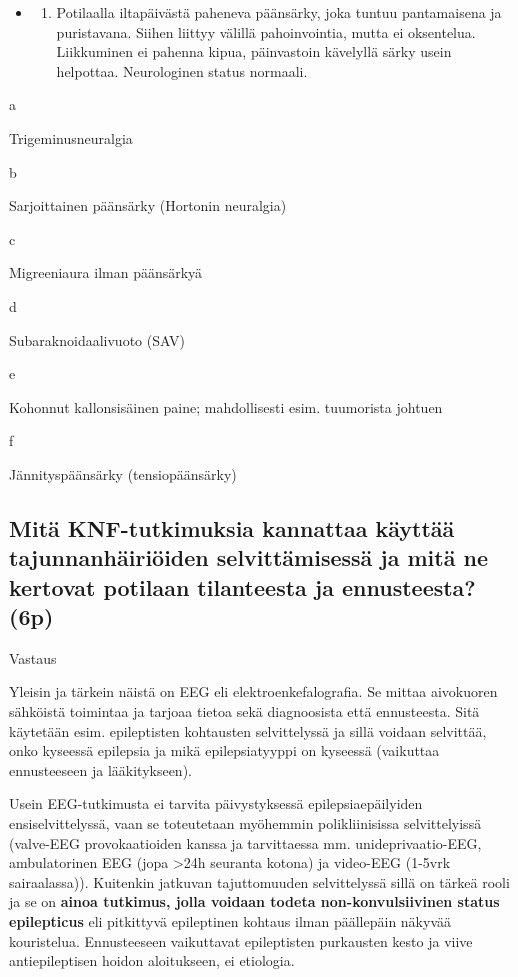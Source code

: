 \documentclass[
]{book}
\providecommand{\tightlist}{%
  \setlength{\itemsep}{0pt}\setlength{\parskip}{0pt}}
\begin{document}
\begin{itemize}
\begin{enumerate}
  \end{enumerate}
\item
  \begin{enumerate}
  \def\labelenumi{\alph{enumi}.}
  \setcounter{enumi}{5}
  \tightlist
  \item
    Potilaalla iltapäivästä paheneva päänsärky, joka tuntuu pantamaisena ja puristavana. Siihen liittyy välillä pahoinvointia, mutta ei oksentelua. Liikkuminen ei pahenna kipua, päinvastoin kävelyllä särky usein helpottaa. Neurologinen status normaali.
  \end{enumerate}
\end{itemize}

a

Trigeminusneuralgia

b

Sarjoittainen päänsärky (Hortonin neuralgia)

c

Migreeniaura ilman päänsärkyä

d

Subaraknoidaalivuoto (SAV)

e

Kohonnut kallonsisäinen paine; mahdollisesti esim. tuumorista johtuen

f

Jännityspäänsärky (tensiopäänsärky)

\subsection{Mitä KNF-tutkimuksia kannattaa käyttää tajunnanhäiriöiden selvittämisessä ja mitä ne kertovat potilaan tilanteesta ja ennusteesta? (6p)}\label{mituxe4-knf-tutkimuksia-kannattaa-kuxe4yttuxe4uxe4-tajunnanhuxe4iriuxf6iden-selvittuxe4misessuxe4-ja-mituxe4-ne-kertovat-potilaan-tilanteesta-ja-ennusteesta-6p}

Vastaus

Yleisin ja tärkein näistä on EEG eli elektroenkefalografia. Se mittaa aivokuoren sähköistä toimintaa ja tarjoaa tietoa sekä diagnoosista että ennusteesta. Sitä käytetään esim. epileptisten kohtausten selvittelyssä ja sillä voidaan selvittää, onko kyseessä epilepsia ja mikä epilepsiatyyppi on kyseessä (vaikuttaa ennusteeseen ja lääkitykseen).

Usein EEG-tutkimusta ei tarvita päivystyksessä epilepsiaepäilyiden ensiselvittelyssä, vaan se toteutetaan myöhemmin polikliinisissa selvittelyissä (valve-EEG provokaatioiden kanssa ja tarvittaessa mm. unideprivaatio-EEG, ambulatorinen EEG (jopa \textgreater24h seuranta kotona) ja video-EEG (1-5vrk sairaalassa)). Kuitenkin jatkuvan tajuttomuuden selvittelyssä sillä on tärkeä rooli ja se on \textbf{ainoa tutkimus, jolla voidaan todeta non-konvulsiivinen status epilepticus} eli pitkittyvä epileptinen kohtaus ilman päällepäin näkyvää kouristelua. Ennusteeseen vaikuttavat epileptisten purkausten kesto ja viive antiepileptisen hoidon aloitukseen, ei etiologia.
\end{document}
